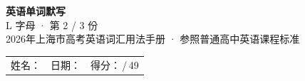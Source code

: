 \documentclass[10pt,a4paper]{article}
\begin{document}
\pagestyle{plain}

\begin{center}
{\LARGE\bfseries 英语单词默写}\\[0.22em]
{\large L 字母 · 第 2 / 3 份}\\[0.18em]
{\small 2026年上海市高考英语词汇用法手册 · 参照普通高中英语课程标准}
\end{center}

\vspace{0.25em}
\noindent\begin{tabular}{@{}p{}@{}p{}@{}p{}@{}}
姓名：\underline{\hspace{2.0cm}} & 日期：\underline{\hspace{2.0cm}} & 得分：\underline{\hspace{1.3cm}}\,/\,49 \\
\end{tabular}

\vspace{0.3em}

\vspace{0.08em}
\end{document}
